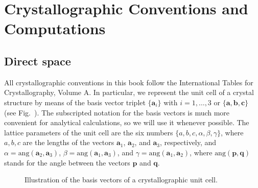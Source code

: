 \section{Crystallographic Conventions and Computations}

\subsection{Direct space}
All crystallographic conventions in this book follow the International Tables for Crystallography, Volume A.  In particular, we represent the unit cell of a crystal structure by means of the basis vector triplet $\{\mathbf{a}_i\}$ with $i=1,\ldots,3$ or $\{\mathbf{a}, \mathbf{b},\mathbf{c}\}$ (see Fig.~). The subscripted notation for the basis vectors is much more convenient for analytical calculations, so we will use it whenever possible. The lattice parameters of the unit cell are the six numbers $\{a,b,c,\alpha,\beta,\gamma\}$, where $a, b, c$ are the lengths of the vectors $\mathbf{a}_1$, $\mathbf{a}_2$, and $\mathbf{a}_3$, respectively, and $\alpha=\text{ang}(\mathbf{a}_2,\mathbf{a}_3)$,  $\beta=\text{ang}(\mathbf{a}_1,\mathbf{a}_3)$,  and $\gamma=\text{ang}(\mathbf{a}_1,\mathbf{a}_2)$, where $\text{ang}(\mathbf{p},\mathbf{q})$ stands for the angle between the vectors $\mathbf{p}$ and $\mathbf{q}$.

\begin{wrapfigure}{r}{0.3\textwidth}
  \centering\leavevmode
\caption{\small Illustration of the basis vectors of a crystallographic unit cell.}
\end{wrapfigure}

